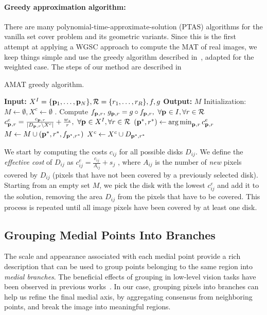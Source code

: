 \documentclass[10pt,twocolumn,letterpaper]{article}
\begin{document}
\paragraph{Greedy approximation algorithm:}
There are many polynomial-time-approximate-solution (PTAS) algorithms for the vanilla set cover problem
and its geometric variants.
Since this is the first attempt at applying a WGSC approach to compute the MAT of real images, we keep things simple
and use the greedy algorithm described in~\cite{vazirani2013approximation}, adapted for the weighted case.
The steps of our method are described in~
\begin{algorithm}[t]
\caption{AMAT greedy algorithm.}
\label{alg:greedy}
	\begin{algorithmic}[1]
	\Statex \textbf{Input:} $X^I=\{\mathbf{p}_{1},\ldots,\mathbf{p}_{N}\},\mathcal{R}=\{r_1,\ldots,r_R\},f,g$
	\Statex \textbf{Output:} $M$
	\State Initialization: $M \leftarrow \emptyset,X^c \leftarrow \emptyset$ .
	\State Compute $f_{\mathbf{p}_{},r},\, g_{\mathbf{p}_{},r} = g \circ f_{\mathbf{p}_{},r},\,\, \forall \mathbf{p}_{} \in I, \forall r \in \mathcal{R}$
		\State $c_{\mathbf{p}_{},r}^e = \frac{c_{\mathbf{p}_{},r}}{|D_{\mathbf{p}_{},r} \setminus X^c|}+\frac{w_s}{r},\,\, \forall \mathbf{p}_{} \in X^I, \forall r \in \mathcal{R}$
		\State $(\mathbf{p}_{}^{*},r^{*}) \leftarrow \operatorname*{arg\,min}_{\mathbf{p}_{},r}{c_{\mathbf{p}_{},r}^e}$		
		\State $M\leftarrow M\cup{(\mathbf{p}_{}^{*},r^{*},f_{\mathbf{p}_{}^{*},r^{*}})}$
		\State $X^c \leftarrow X^c \cup D_{\mathbf{p}_{}^{*},r^{*}}$ 
	\EndWhile
	\end{algorithmic}
\end{algorithm}
We start by computing the costs $c_{ij}$ for all possible disks $D_{ij}$.
We define the \emph{effective cost} of $D_{ij}$ as $c_{ij}^e = \frac{c_{ij}}{A_{ij}} + s_j$ , where $A_{ij}$ is the number
of \emph{new} pixels covered by $D_{ij}$ (pixels that have not been covered by a previously selected disk).
Starting from an empty set $M$, we pick the disk with the lowest $c_{ij}^e$ and add it to the solution, 
removing the area $D_{ij}$ from the pixels that have to be covered.
This process is repeated until all image pixels have been covered by at least one disk.

\subsection{Grouping Medial Points Into Branches}\label{sec:method:grouping}
The scale and appearance associated with each medial point provide a rich
description that can be used to group points belonging to the same region into \emph{medial branches}.
The beneficial effects of grouping in low-level vision tasks have been
observed in previous works~\cite{felzenszwalb2006min,zhu2007untangling,kokkinos2010highly,qi2015making}.
In our case, grouping pixels into branches can help us refine the final medial axis, 
by aggregating consensus from neighboring points, and break the image into meaningful regions.
\end{document}
